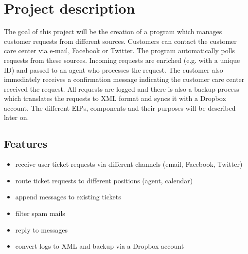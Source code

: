 







\tableofcontents
\newpage

\section{Project description\label{sec:proddesc}}
The goal of this project will be the creation of a program which manages customer requests from different sources. Customers can contact the customer care center via e-mail, Facebook or Twitter. The program automatically polls requests from these sources. Incoming requests are enriched (e.g. with a unique ID) and passed to an agent who processes the request. The customer also immediately receives a confirmation message indicating the customer care center received the request. All requests are logged and there is also a backup process which translates the requests to XML format and syncs it with a Dropbox account. The different EIPs, components and their purposes will be described later on.

\subsection{Features}
\begin{itemize}
    \item receive user ticket requests via different channels (email, Facebook, Twitter)
    \item route ticket requests to different positions (agent, calendar)
    \item append messages to existing tickets
    \item filter spam mails
    \item reply to messages
    \item convert logs to XML and backup via a Dropbox account
\end{itemize}

